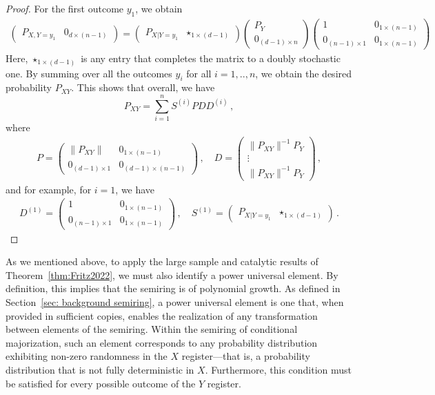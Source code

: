 \documentclass[aps,pra,11pt,onecolumn,nofootinbib,tightenlines]{revtex4-2}
\theoremstyle{definition}
\begin{document}
\begin{proof}
For the first outcome $y_1$, we obtain
\begin{align}
\begin{pmatrix}
     P_{X,Y=y_1} & 0_{d \times (n-1)}  
\end{pmatrix}=
\begin{pmatrix}
    P_{X|Y=y_1} & \star_{1\times (d-1)} 
\end{pmatrix} 
\begin{pmatrix}
     P_{Y} \\
    0_{(d-1) \times n}   
\end{pmatrix}
\begin{pmatrix}
    1 & 0_{1\times (n-1)}\\
    0_{(n-1) \times 1} & 0_{1\times (n-1)} 
\end{pmatrix}
\end{align}
Here, $\star_{1\times (d-1)}$ is any entry that completes the matrix to a doubly stochastic one. By summing over all the outcomes $y_i$ for all $i=1,..,n$, we obtain the desired probability $P_{XY}$. This shows that overall, we have
\begin{equation}
    P_{XY} = \sum_{i=1}^n S^{(i)} P DD^{(i)} \,, 
\end{equation}
where 
\begin{align}
P=\begin{pmatrix}
    \|P_{XY}\| & 0_{1\times (n-1)} \\
    0_{(d-1)\times 1} & 0_{(d-1)\times (n-1)}
\end{pmatrix} \,, \quad 
    D=\begin{pmatrix}
    \|P_{XY}\|^{-1} P_{Y} \\
    \vdots \\
    \|P_{XY}\|^{-1} P_{Y}    
\end{pmatrix} \,,
\end{align}
and for example, for $i=1$, we have
\begin{align}
D^{(1)}=\begin{pmatrix}
    1 & 0_{1\times (n-1)}\\
    0_{(n-1) \times 1} & 0_{1\times (n-1)} 
\end{pmatrix} \,,\quad 
S^{(1)} = \begin{pmatrix}
    P_{X|Y=y_1} & \star_{1\times (d-1)} 
\end{pmatrix}  \,.
\end{align}

\end{proof}

As we mentioned above, to apply the large sample and catalytic results of Theorem~\ref{thm:Fritz2022}, we must also identify a power universal element. By definition, this implies that the semiring is of polynomial growth. As defined in Section~\ref{sec: background semiring}, a power universal element is one that, when provided in sufficient copies, enables the realization of any transformation between elements of the semiring. Within the semiring of conditional majorization, such an element corresponds to any probability distribution exhibiting non-zero randomness in the $X$ register—that is, a probability distribution that is not fully deterministic in $X$. Furthermore, this condition must be satisfied for every possible outcome of the $Y$ register.
\end{document}
